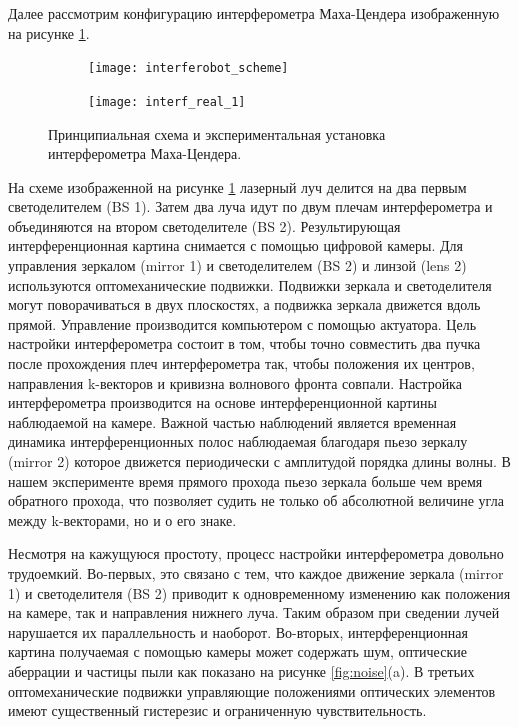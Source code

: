 Далее рассмотрим конфигурацию интерферометра Маха-Цендера изображенную на рисунке \ref{fig:interf_scheme_1}. 

\begin{figure}[ht]
    \centering
     \begin{subfigure}[b]{0.45\linewidth}
         \centering
         \texttt{[image: interferobot\_scheme]}
     \end{subfigure}
     \centering
     \begin{subfigure}[b]{0.45\linewidth}
         \centering
         \texttt{[image: interf\_real\_1]}
     \end{subfigure}
    \caption{
     Принципиальная схема и экспериментальная установка интерферометра Маха-Цендера. }
\label{fig:interf_scheme_1}
\end{figure}

На схеме изображенной на рисунке \ref{fig:interf_scheme_1} лазерный луч делится на два первым светоделителем (BS 1). Затем два луча идут по двум плечам интерферометра и объединяются на втором светоделителе (BS 2). Результирующая интерференционная картина снимается с помощью цифровой камеры. Для управления зеркалом (mirror 1) и светоделителем (BS 2) и линзой (lens 2) используются оптомеханические подвижки. Подвижки зеркала и светоделителя могут поворачиваться в двух плоскостях, а подвижка зеркала движется вдоль прямой. Управление производится компьютером с помощью актуатора. Цель настройки интерферометра состоит в том, чтобы точно совместить два пучка после прохождения плеч интерферометра так, чтобы положения их центров, направления k-векторов и кривизна волнового фронта совпали. Настройка интерферометра производится на основе интерференционной картины наблюдаемой на камере. Важной частью наблюдений является временная динамика интерференционных полос наблюдаемая благодаря пьезо зеркалу (mirror 2) которое движется периодически с амплитудой порядка длины волны. В нашем эксперименте время прямого прохода пьезо зеркала больше чем время обратного прохода, что позволяет судить не только об абсолютной величине угла между k-векторами, но и о его знаке. 

Несмотря на кажущуюся простоту, процесс настройки интерферометра довольно трудоемкий. Во-первых, это связано с тем, что каждое движение зеркала  (mirror 1) и светоделителя (BS 2) приводит к одновременному изменению как положения на камере, так и направления нижнего луча. Таким образом при сведении лучей нарушается их параллельность и наоборот. Во-вторых, интерференционная картина получаемая с помощью камеры может содержать шум, оптические аберрации и частицы пыли как показано на рисунке \ref{fig:noise}(a). В третьих оптомеханические подвижки управляющие положениями оптических элементов имеют существенный гистерезис и ограниченную чувствительность.

